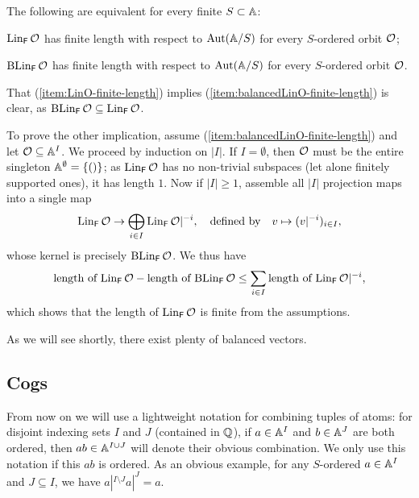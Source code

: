 \begin{claim}\label{claim:reduction-to-kernel}
    The following are equivalent for every finite $S \subset \A$:
    \begin{alphaenumerate}
        \item\label{item:LinO-finite-length}
        $\Lin_\FF \cal O$ has finite length with respect to $\Aut(\A/S)$ for every $S$-ordered orbit $\cal O$;

        \item\label{item:balancedLinO-finite-length}
        $\Ker_\FF \cal O$ has finite length with respect to $\Aut(\A/S)$ for every $S$-ordered orbit $\cal O$.
    \end{alphaenumerate}
\end{claim}
\begin{claimproof}
    That (\ref{item:LinO-finite-length}) implies (\ref{item:balancedLinO-finite-length}) is clear, as $\Ker_\FF \cal O \subseteq \Lin_\FF \cal O$.
    
    To prove the other implication, assume (\ref{item:balancedLinO-finite-length}) and let $\cal O \subseteq \A^I$.
    We proceed by induction on $|I|$.
    If $I = \emptyset$, then $\cal O$ must be the entire singleton $\A^\emptyset = \{ () \}$; 
    as $\Lin_\FF \cal O$ has no non-trivial subspaces (let alone finitely supported ones), it has length $1$.
    Now if $|I| \geq 1$, assemble all $|I|$ projection maps into a single map
    \begin{align*}
        \Lin_\FF \cal O \to \bigoplus_{i \in I} \Lin_\FF \cal O|^{-i},
        \quad \text{defined by} \quad
        v \mapsto ( v|^{-i} )_{i \in I},
    \end{align*}
    whose kernel is precisely $\Ker_\FF \cal O$.
    We thus have
    \[
        \text{length of $\Lin_\FF \cal O$}  - \text{length of $\Ker_\FF \cal O$}
        \leq \sum_{i \in I} \text{length of $\Lin_\FF \cal O|^{-i}$}, 
    \]
    which shows that the length of $\Lin_\FF \cal O$ is finite from the assumptions.
\end{claimproof}

As we will see shortly, there exist plenty of balanced vectors.

\subsection{Cogs}
From now on we will use a lightweight notation for combining tuples of atoms: 
for disjoint indexing sets $I$ and $J$ (contained in $\Q$), 
if $a\in\A^I$ and $b\in\A^{J}$ are both ordered, 
then $ab\in \A^{I\cup J}$ will denote their obvious combination. 
We only use this notation if this $ab$ is ordered. 
As an obvious example, for any $S$-ordered $a\in\A^I$ and $J\subseteq I$, we have $a|^{I\setminus J}a|^J=a$.

